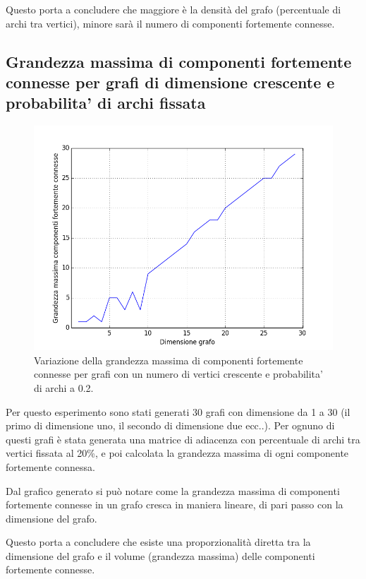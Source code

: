 \documentclass[a4paper,12pt]{article}
\begin{document}
Questo porta a concludere che maggiore è la densità del grafo (percentuale di archi tra vertici), minore sarà il numero di componenti fortemente connesse.

\clearpage
\subsection{Grandezza massima di componenti fortemente connesse per grafi di dimensione crescente e probabilita' di archi fissata}
\begin{figure}[h]
    \centering
    \captionsetup{justification=centering,margin=1cm}
    \includegraphics[width=1.0\textwidth]{test3}
    \caption{Variazione della grandezza massima di componenti fortemente connesse per grafi con un numero di vertici crescente e probabilita' di archi a 0.2.}
    \label{fig:test3}
\end{figure}

Per questo esperimento sono stati generati 30 grafi con dimensione da 1 a 30 (il primo di dimensione uno, il secondo di dimensione due ecc..). Per ognuno di questi grafi è stata generata una matrice di adiacenza con percentuale di archi tra vertici fissata al 20\%, e poi calcolata la grandezza massima di ogni componente fortemente connessa.
\newline

Dal grafico generato si può notare come la grandezza massima di componenti fortemente connesse in un grafo cresca in maniera lineare, di pari passo con la dimensione del grafo.
\newline

Questo porta a concludere che esiste una proporzionalità diretta tra la dimensione del grafo e il volume (grandezza massima) delle componenti fortemente connesse.
\end{document}
